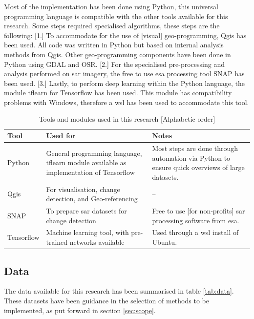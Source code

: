 \noindent Most of the implementation has been done using Python, this universal programming language is compatible with the other tools available for this research. Some steps required specialised algorithms, these steps are the following: [1.] To accommodate for the use of [visual] geo-programming, Qgis has been used. All code was written in Python but based on internal analysis methods from Qgis. Other geo-programming components have been done in Python using GDAL and OSR. [2.] For the specialised pre-processing and analysis performed on \ac{sar} imagery, the free to use \ac{esa} processing tool SNAP has been used. [3.] Lastly, to perform deep learning within the Python language, the module tflearn for Tensorflow has been used. This module has compatibility problems with Windows, therefore a \ac{wsl} has been used to accommodate this tool.
\begin{table} [H]
	\centering
	\captionsetup{justification=raggedright,singlelinecheck=false}	
	\caption{Tools and modules used in this research [Alphabetic order]}
	\begin{footnotesize}
		\begin{tabular}{lp{5cm}p{4cm}}
			\toprule
			Tool & Used for & Notes \\
			\midrule
			Python & General programming language, tflearn module available as implementation of Tensorflow & Most steps are done through automation via Python to ensure quick overviews of large datasets.\\
			Qgis & For visualisation, change detection, and Geo-referencing & -- \\
			SNAP & To prepare \ac{sar} datasets for change detection & Free to use [for non-profits] \ac{sar} processing software from \ac{esa}. \\
			Tensorflow & Machine learning tool, with pre-trained networks available & Used through a \ac{wsl} install of Ubuntu. \\
			\bottomrule
		\end{tabular}
	\end{footnotesize}
	\label{tab:tools}
\end{table}

\subsection{Data} \label{sec:data}
The data available for this research has been summarised in table \ref{tab:data}. These datasets have been guidance in the selection of methods to be implemented, as put forward in section \ref{sec:scope}.\\

